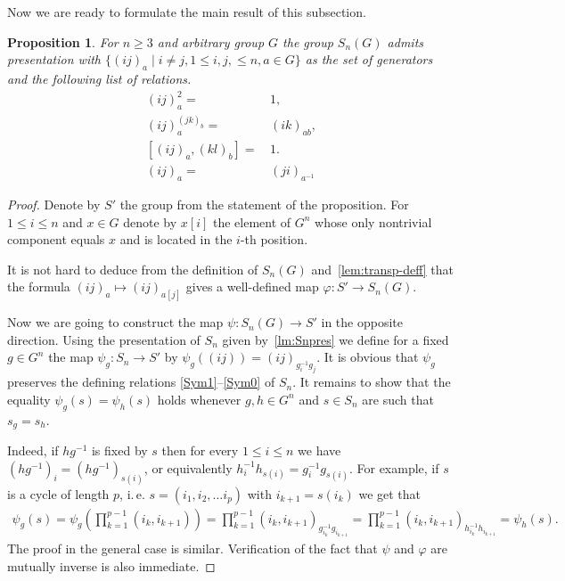 \documentclass[oneside, 10pt]{amsart}
\theoremstyle{plain}
\numberwithin{equation}{section}
\numberwithin{lemma}{section}
\newtheorem{prop}[lemma]{Proposition}
\theoremstyle{remark}
\theoremstyle{definition}
\begin{document}
Now we are ready to formulate the main result of this subsection.
\begin{prop} \label{prop:Q-pres} For $n\geq 3$ and arbitrary group $G$ the group $S_n(G)$ admits presentation with 
$\{(ij)_a \mid i\neq j, 1\leq i,j,\leq n, a\in G\}$ 
as the set of generators and the following list of relations.
\begin{align}
(ij)_a^2 = &\, 1,                \label{Q1} \tag{SG1} \\
(ij)_a^{(jk)_b} = &\, (ik)_{ab}, \label{Q2} \tag{SG2} \\
[(ij)_a, (kl)_b] = &\,1.         \label{Q3} \tag{SG3} \\
(ij)_a =&\, (ji)_{a^{-1}}        \label{Q4} \tag{SG4} 
\end{align}
\end{prop}
\begin{proof}
Denote by $S'$ the group from the statement of the proposition.
For $1\leq i\leq n$ and $x\in G$ denote by $x[i]$ the element of $G^n$ 
 whose only nontrivial component equals $x$ and is located in the $i$-th position.

It is not hard to deduce from the definition of $S_n(G)$ and~\cref{lem:transp-deff} 
 that the formula $(ij)_a \mapsto (ij)_{a[j]}$ gives a well-defined map $\varphi\colon S'\to S_n(G)$.

Now we are going to construct the map $\psi\colon S_n(G)\to S'$ in the opposite direction. 
Using the presentation of $S_n$ given by~\cref{lm:Snpres}  we define for a fixed $g\in G^n$ the map 
 $\psi_g\colon S_n \to S'$ by $\psi_g((ij)) = (ij)_{g_i^{-1} g_j}.$
It is obvious that $\psi_g$ preserves the defining relations \eqref{Sym1}--\eqref{Sym0} of $S_n$. 
It remains to show that the equality $\psi_g(s) = \psi_h(s)$ holds whenever $g, h\in G^n$ and $s\in S_n$ are such that $s_g=s_h$.

Indeed, if $hg^{-1}$ is fixed by $s$ then for every $1\leq i\leq n$ we have $(hg^{-1})_i = (hg^{-1})_{s(i)}$, or equivalently
$h_i^{-1} h_{s(i)} = g_i^{-1} g_{s(i)}$. %
For example, if $s$ is a cycle of length $p$, i.\,e. $s=(i_1, i_2, \ldots i_p)$ with $i_{k+1} = s(i_k)$ we get that
\begin{multline} \nonumber
 \psi_g(s) = \psi_g\left({\prod\limits_{k=1}^{p-1}(i_k, i_{k+1})}\right) = 
 \prod\limits_{k=1}^{p-1}\left(i_k, i_{k+1}\right)_{g_{i_k}^{-1} g_{i_{k+1}}} = 
 \prod\limits_{k=1}^{p-1}\left(i_k, i_{k+1}\right)_{h_{i_k}^{-1} h_{i_{k+1}}} = \psi_h(s).
\end{multline}
The proof in the general case is similar.
Verification of the fact that $\psi$ and $\varphi$ are mutually inverse is also immediate.
\end{proof}
\end{document}
